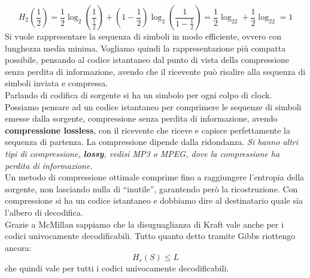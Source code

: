\documentclass[a4paper,12pt, oneside]{book}
\begin{document}
\[H_2\left(\frac{1}{2}\right)=
  \frac{1}{2}\log_2\left(\frac{1}{\frac{1}{2}}\right)+
  \left(1-\frac{1}{2}\right)\log_2\left(\frac{1}{1-\frac{1}{2}}\right)=
  \frac{1}{2}\log_22+\frac{1}{2}\log_22=1\] 
Si vuole rappresentare la sequenza di simboli in modo efficiente, ovvero con
lunghezza media minima. Vogliamo quindi la rappresentazione più compatta
possibile, pensando al codice istantaneo dal punto di vista della compressione
senza perdita di informazione, avendo che il ricevente può risalire alla
sequenza di simboli inviata e compressa.\\
Parlando di codifica di sorgente si ha un simbolo per ogni colpo di
clock. Possiamo pensare ad un codice istantaneo per comprimere le sequenze di
simboli emesse dalla sorgente, compressione senza perdita di informazione,
avendo \textbf{compressione lossless}, con il
ricevente che riceve e capisce perfettamente la sequenza di partenza. La
compressione dipende dalla ridondanza.
\textit{Si hanno altri tipi di compressione, \textbf{lossy}, vedisi MP3 o MPEG,
  dove la compressione ha perdita di informazione.}\\
Un metodo di compressione ottimale comprime fino a raggiungere l'entropia della
sorgente, non lasciando nulla di ``inutile'', garantendo però la
ricostruzione. Con compressione si ha un codice istantaneo e dobbiamo dire al
destinatario quale sia l'albero di decodifica. \\
Grazie a McMillan sappiamo che la disuguaglianza di Kraft vale anche per i
codici univocamente decodificabili. Tutto quanto detto tramite Gibbs riottengo
ancora:
\[H_r(S)\leq L\]
che quindi vale per tutti i codici univocamente decodificabili.\\
\end{document}
